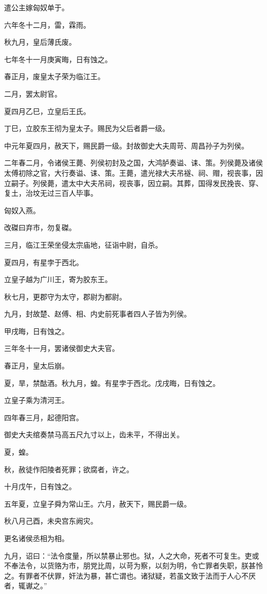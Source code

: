 \documentclass[]{article}
\begin{document}
遣公主嫁匈奴单于。

六年冬十二月，雷，霖雨。

秋九月，皇后薄氏废。

七年冬十一月庚寅晦，日有蚀之。

春正月，废皇太子荣为临江王。

二月，罢太尉官。

夏四月乙巳，立皇后王氏。

丁巳，立胶东王彻为皇太子。赐民为父后者爵一级。

中元年夏四月，赦天下，赐民爵一级。封故御史大夫周苛、周昌孙子为列侯。

二年春二月，令诸侯王薨、列侯初封及之国，大鸿胪奏谥、诔、策。列侯薨及诸侯太傅初除之官，大行奏谥、诔、策。王薨，遣光禄大夫吊襚、祠、赗，视丧事，因立嗣子。列侯薨，遣太中大夫吊祠，视丧事，因立嗣。其葬，国得发民挽丧、穿、复土，治坟无过三百人毕事。

匈奴入燕。

改磔曰弃市，勿复磔。

三月，临江王荣坐侵太宗庙地，征诣中尉，自杀。

夏四月，有星孛于西北。

立皇子越为广川王，寄为胶东王。

秋七月，更郡守为太守，郡尉为都尉。

九月，封故楚、赵傅、相、内史前死事者四人子皆为列侯。

甲戌晦，日有蚀之。

三年冬十一月，罢诸侯御史大夫官。

春正月，皇太后崩。

夏，旱，禁酤酒。秋九月，蝗。有星孛于西北。戊戌晦，日有蚀之。

立皇子乘为清河王。

四年春三月，起德阳宫。

御史大夫绾奏禁马高五尺九寸以上，齿未平，不得出关。

夏，蝗。

秋，赦徒作阳陵者死罪；欲腐者，许之。

十月戊午，日有蚀之。

五年夏，立皇子舜为常山王。六月，赦天下，赐民爵一级。

秋八月己酉，未央宫东阙灾。

更名诸侯丞相为相。

九月，诏曰：``法令度量，所以禁暴止邪也。狱，人之大命，死者不可复生。吏或不奉法令，以货赂为市，朋党比周，以苛为察，以刻为明，令亡罪者失职，朕甚怜之。有罪者不伏罪，奸法为暴，甚亡谓也。诸狱疑，若虽文致于法而于人心不厌者，辄谳之。''
\end{document}
